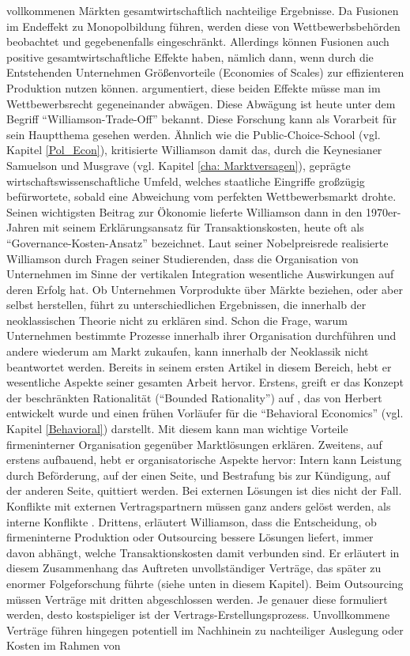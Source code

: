 vollkommenen Märkten gesamtwirtschaftlich nachteilige Ergebnisse. Da Fusionen im Endeffekt zu Monopolbildung führen, werden diese von Wettbewerbsbehörden beobachtet und gegebenenfalls eingeschränkt. Allerdings können Fusionen auch positive gesamtwirtschaftliche Effekte haben, nämlich dann, wenn durch die Entstehenden Unternehmen Größenvorteile (Economies of Scales) zur effizienteren Produktion nutzen können. \textcite{Williamson1968} argumentiert, diese beiden Effekte müsse man im Wettbewerbsrecht gegeneinander abwägen. Diese Abwägung ist heute unter dem Begriff "`Williamson-Trade-Off"' bekannt. Diese Forschung kann als Vorarbeit für sein Hauptthema gesehen werden. Ähnlich wie die Public-Choice-School (vgl. Kapitel  \ref{Pol_Econ}), kritisierte Williamson damit das, durch die Keynesianer Samuelson und Musgrave (vgl. Kapitel \ref{cha: Marktversagen}), geprägte wirtschaftswissenschaftliche Umfeld, welches staatliche Eingriffe großzügig befürwortete, sobald eine Abweichung vom perfekten Wettbewerbsmarkt drohte. Seinen wichtigsten Beitrag zur Ökonomie lieferte Williamson dann in den 1970er-Jahren mit seinem Erklärungsansatz für Transaktionskosten, heute oft als "`Governance-Kosten-Ansatz"' bezeichnet. Laut seiner Nobelpreisrede \textcite{Williamson2009} realisierte Williamson durch Fragen seiner Studierenden, dass die Organisation von Unternehmen im Sinne der vertikalen Integration wesentliche Auswirkungen auf deren Erfolg hat. Ob Unternehmen Vorprodukte über Märkte beziehen, oder aber selbst herstellen, führt zu unterschiedlichen Ergebnissen, die innerhalb der neoklassischen Theorie nicht zu erklären sind. Schon die Frage, warum Unternehmen bestimmte Prozesse innerhalb ihrer Organisation durchführen und andere wiederum am Markt zukaufen, kann innerhalb der Neoklassik nicht beantwortet werden. Bereits in seinem ersten Artikel in diesem Bereich, hebt er wesentliche Aspekte seiner gesamten Arbeit hervor. Erstens, greift er das Konzept der beschränkten Rationalität ("`Bounded Rationality"') auf \parencite[S. 113]{Williamson1971}, das von Herbert \textcite{Simon1955} entwickelt wurde und einen frühen Vorläufer für die "`Behavioral Economics"' (vgl. Kapitel \ref{Behavioral}) darstellt. Mit diesem kann man wichtige Vorteile firmeninterner Organisation gegenüber Marktlösungen erklären. Zweitens, auf erstens aufbauend, hebt er organisatorische Aspekte hervor: Intern kann Leistung durch Beförderung, auf der einen Seite, und Bestrafung bis zur Kündigung, auf der anderen Seite, quittiert werden. Bei externen Lösungen ist dies nicht der Fall. Konflikte mit externen Vertragspartnern müssen ganz anders gelöst werden, als interne Konflikte \parencite[S. 113f]{Williamson1971}. Drittens, erläutert Williamson, dass die Entscheidung, ob firmeninterne Produktion oder Outsourcing bessere Lösungen liefert, immer davon abhängt, welche Transaktionskosten damit verbunden sind. Er erläutert in diesem Zusammenhang das Auftreten unvollständiger Verträge, das später zu enormer Folgeforschung führte (siehe unten in diesem Kapitel). Beim Outsourcing müssen Verträge mit dritten abgeschlossen werden. Je genauer diese formuliert werden, desto kostspieliger ist der Vertrags-Erstellungsprozess. Unvollkommene Verträge führen hingegen potentiell im Nachhinein zu nachteiliger Auslegung oder Kosten im Rahmen von 
